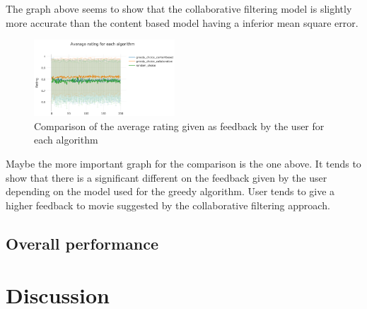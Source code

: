 \documentclass[letterpaper]{article}
\begin{document}
The graph above seems to show that the collaborative filtering model is slightly more accurate than the content based model having a inferior mean square error.

\begin{figure}[H]
\begin{center}
\includegraphics[width=0.47\textwidth]{img/collabo3.png}
\caption{Comparison of the average rating given as feedback by the user for each algorithm}
\label{schema}
\end{center}
\end{figure}

Maybe the more important graph for the comparison is the one above. It tends to show that there is a significant different on the feedback given by the user depending on the model used for the greedy algorithm. User tends to give a higher feedback to movie suggested by the collaborative filtering approach.


\subsection{Overall performance}

\section{Discussion}





\end{document}
